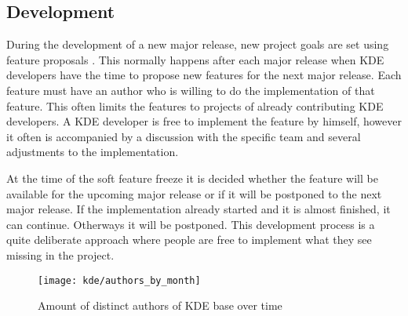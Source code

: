 
\subsection{Development} %

During the development of a new major release, new project goals are set using
feature proposals \cite{KDEDevelopmentModel,KDEFAQ}. This normally happens
after each major release when KDE developers have the time to propose new
features for the next major release. Each feature must have an author who is
willing to do the implementation of that feature. This often limits the
features to projects of already contributing KDE developers. A KDE developer is
free to implement the feature by himself, however it often is accompanied by a
discussion with the specific team and several adjustments to the
implementation.

At the time of the soft feature freeze it is decided whether the feature will
be available for the upcoming major release or if it will be postponed to the
next major release. If the implementation already started and it is almost
finished, it can continue. Otherways it will be postponed. This development
process is a quite deliberate approach where people are free to implement what
they see missing in the project.

\begin{figure}[htbp]
  \centering
  \texttt{[image: kde/authors\_by\_month]}
  \caption{Amount of distinct authors of KDE base over time}
\end{figure}


